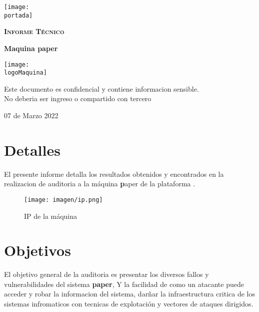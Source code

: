 \documentclass[a4paper]{article} %
\newcommand{\portada}{index.png}
\newcommand{\Maquina}{paper} %
\newcommand{\logoMaquina}{paper.png} %
\newcommand{\starDate}{07 de Marzo 2022}
\begin{document}
    \begin{titlepage}
        \cfoot{\thepage}
        \centering
        \texttt{[image: \\portada]}\par\vspace{1cm}
        {\scshape\LARGE \textbf{Informe Técnico}\par}
        \vspace{0.2cm}
        {\Huge\bfseries\textcolor{grenPortada}{Maquina \Maquina}\par} %
        \vfill\vfill
        \texttt{[image: \\logoMaquina]}\par\vspace{1cm}
        \vfill
        \begin{tcolorbox}[colback=red!5!white,colframe=red!75!black]
            \centering
            Este documento es confidencial y contiene informacion sensible.\\No deberia ser ingreso o compartido con tercero
        \end{tcolorbox} 
        \vfill\vfill\vfill\vfill %
        {\large \starDate\par}
          
    \end{titlepage}

    \clearpage
    \tableofcontents
    \clearpage
    
    \section{Detalles}
    El presente informe detalla los resultados obtenidos y encontrados en la realizacion de auditoria a la máquina {\textbf\Maquina} de la plataforma \href{https://hackthebox.eu}{}.
    \vspace{1.2cm}
    \begin{figure}[h]
        \centering
        \texttt{[image: imagen/ip.png]}
        \caption{IP de la máquina}
        
    \end{figure}
    \vspace{2.0cm}
    \section{Objetivos}
    El objetivo general de la auditoria es presentar los diversos fallos y vulnerabilidades del sistema \textbf{\Maquina}, Y la facilidad de como un atacante
    puede acceder y robar la informacion del sistema, darñar la infraestructura critica de los sistemas infromaticos con tecnicas de explotación y vectores de ataques dirigidos.
    \vspace{0.2cm}
\end{document}
